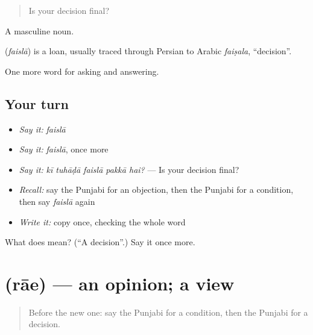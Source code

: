 \begin{quote}
Is your decision final?
\end{quote}

A masculine noun.

\begin{cousinweb}
\textbf{} (\emph{faislā}) is a loan, usually traced through Persian to Arabic \emph{faiṣala}, \textquotedblleft{}decision\textquotedblright{}.
\end{cousinweb}

\begin{grammarlens}[title={What you've built}]
One more word for asking and answering.
\end{grammarlens}

\subsection*{Your turn}
\begin{itemize}
\raggedright
  \item \emph{Say it:} \emph{faislā}
  \item \emph{Say it:} \emph{faislā}, once more
  \item \emph{Say it:} \emph{kī tuhāḍā faislā pakkā hai?} — Is your decision final?
  \item \emph{Recall:} say the Punjabi for an objection, then the Punjabi for a condition, then say \emph{faislā} again
  \item \emph{Write it:} copy \textbf{} once, checking the whole word
\end{itemize}

\begin{tcolorbox}[breakable,colback=teal!4,colframe=teal!35!black,title={Before you move on}]
What does  mean? (\textquotedblleft{}A decision\textquotedblright{}.) Say it once more.
\end{tcolorbox}
\section[\texorpdfstring{\pa{ਰਾਏ} (rāe)}{ਰਾਏ (rāe)}]{ (rāe) — an opinion; a view}

\label{lesson:PA-C345-rae}



\begin{quote}
Before the new one: say the Punjabi for a condition, then the Punjabi for a decision.
\end{quote}

